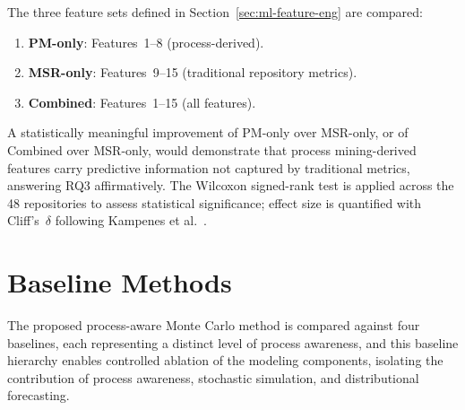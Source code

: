 The three feature sets defined in Section~\ref{sec:ml-feature-eng}
are compared:
\begin{enumerate}
  \item \textbf{PM-only}: Features~1--8 (process-derived).
  \item \textbf{MSR-only}: Features~9--15 (traditional repository metrics).
  \item \textbf{Combined}: Features~1--15 (all features).
\end{enumerate}
A statistically meaningful improvement of PM-only over MSR-only, or
of Combined over MSR-only, would demonstrate that process
mining-derived features carry predictive information not captured by
traditional metrics, answering RQ3 affirmatively.
The Wilcoxon signed-rank test is applied across the 48 repositories
to assess statistical significance; effect size is quantified with
Cliff's~$\delta$ following Kampenes et al.\
\cite{kampenes2007systematic}.
\section{Baseline Methods}
\label{sec:baselines}

The proposed process-aware Monte Carlo method is compared against four baselines, each representing a distinct level of process awareness, and this baseline hierarchy enables controlled ablation of the modeling components, isolating the contribution of process awareness, stochastic simulation, and distributional forecasting.


